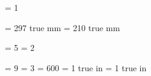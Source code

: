 

\pdfoutput           = 1

\pdfpageheight       = 297 true mm
\pdfpagewidth        = 210 true mm

\pdfminorversion     = 5
\pdfobjcompresslevel = 2

\pdfcompresslevel    = 9
\pdfdecimaldigits    = 3
\pdfpkresolution     = 600
\pdfhorigin          = 1 true in
\pdfvorigin          = 1 true in